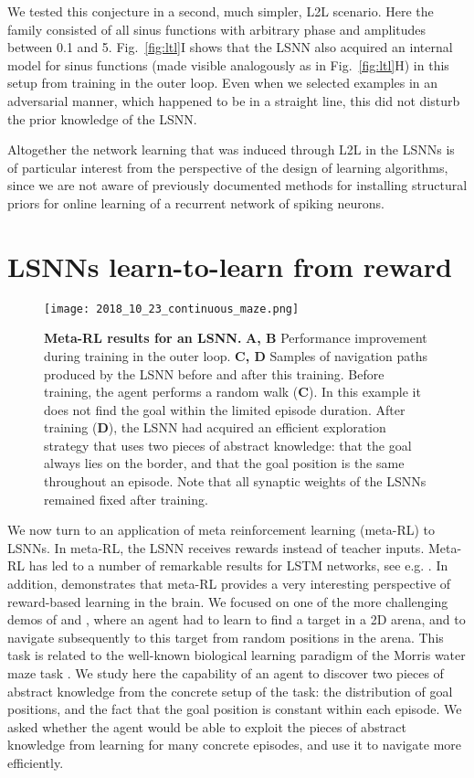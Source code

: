 \documentclass{article} \pdfoutput=1
\begin{document}
We tested this conjecture in a second, much simpler, L2L scenario.
Here the family  consisted of all sinus functions with arbitrary phase and amplitudes between 0.1 and 5. Fig.~\ref{fig:ltl}I shows that the LSNN also acquired an internal model for sinus functions (made visible analogously as in Fig.~\ref{fig:ltl}H) in this setup from training in the outer loop.  
Even when we selected examples in an adversarial manner, which happened to be in a straight line, this did not disturb the prior knowledge of the LSNN.




Altogether the network learning that was induced through L2L in the LSNNs is of particular interest from the perspective of the design of learning algorithms, since we are not aware of previously documented methods for installing structural priors 
for online learning of a recurrent network of spiking neurons.



\section{LSNNs learn-to-learn from reward}\label{sec:meta-RL}

\begin{figure}
	\texttt{[image: 2018\_10\_23\_continuous\_maze.png]}
\caption{\textbf{Meta-RL results for an LSNN.}  \textbf{A, B} Performance improvement during
training in the outer loop. \textbf{C, D} Samples of navigation paths produced by the LSNN before and after this training.
Before training, the agent performs a random walk (\textbf{C}).
In this example it does not find the goal within the limited episode duration.
After training (\textbf{D}), the LSNN had acquired an efficient exploration strategy that uses two pieces of abstract knowledge:
that the goal always lies on the border, and that the goal position is the same throughout an episode. Note that all synaptic weights of the LSNNs remained fixed after training.
} 
\label{fig:maze} 
\end{figure}

We now turn to an application of meta reinforcement learning (meta-RL) to LSNNs. In meta-RL, the LSNN receives rewards instead of teacher inputs.
Meta-RL has led to a
number of remarkable results for LSTM networks, see e.g. \cite{wang2016learning,duan2016rl}. In
addition, \cite{WangETAL:18} demonstrates that meta-RL provides a very interesting
perspective of reward-based learning in the brain. We focused on one of the
more challenging demos of \cite{wang2016learning} and \cite{duan2016rl}, where an agent had
to learn to find a target in a 2D arena, and to navigate subsequently to this target from
random positions in the arena.
This task is related to the well-known biological learning paradigm of the Morris water maze task \cite{morris1984developments,vasilaki2009spike}.
We study here the capability of an agent to discover two pieces of abstract knowledge from the concrete setup of the task: the distribution of goal positions, and the fact that the goal position is constant within each episode.
We asked whether the agent would be able to exploit the pieces of abstract knowledge from learning for many concrete episodes, and use it to navigate more efficiently.
\end{document}
